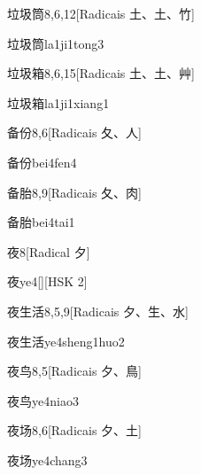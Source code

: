 \begin{entry}{垃圾筒}{8,6,12}[Radicais ⼟、⼟、⽵]
  \begin{phonetics}{垃圾筒}{la1ji1tong3}
  \end{phonetics}
\end{entry}

\begin{entry}{垃圾箱}{8,6,15}[Radicais ⼟、⼟、⾋]
  \begin{phonetics}{垃圾箱}{la1ji1xiang1}
  \end{phonetics}
\end{entry}

\begin{entry}{备份}{8,6}[Radicais ⼡、⼈]
  \begin{phonetics}{备份}{bei4fen4}
  \end{phonetics}
\end{entry}

\begin{entry}{备胎}{8,9}[Radicais ⼡、⾁]
  \begin{phonetics}{备胎}{bei4tai1}
  \end{phonetics}
\end{entry}

\begin{entry}{夜}{8}[Radical ⼣]
  \begin{phonetics}{夜}{ye4}[][HSK 2]
  \end{phonetics}
\end{entry}

\begin{entry}{夜生活}{8,5,9}[Radicais ⼣、⽣、⽔]
  \begin{phonetics}{夜生活}{ye4sheng1huo2}
  \end{phonetics}
\end{entry}

\begin{entry}{夜鸟}{8,5}[Radicais ⼣、⿃]
  \begin{phonetics}{夜鸟}{ye4niao3}
  \end{phonetics}
\end{entry}

\begin{entry}{夜场}{8,6}[Radicais ⼣、⼟]
  \begin{phonetics}{夜场}{ye4chang3}
  \end{phonetics}
\end{entry}

